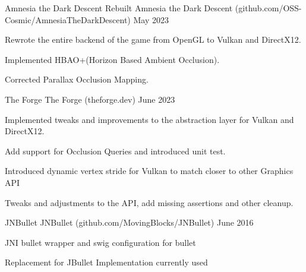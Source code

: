 

\begin{cventries}
  
  \cventry
  {Amnesia the Dark Descent Rebuilt} %
  {Amnesia the Dark Descent ({\tiny github.com/OSS-Cosmic/AmnesiaTheDarkDescent})} %
  {} 
  { May 2023 }
  {
    \begin{cvitems} %
      \item{Rewrote the entire backend of the game from OpenGL to Vulkan and DirectX12.}
      \item{Implemented HBAO+(Horizon Based Ambient Occlusion).}
      \item{Corrected Parallax Occlusion Mapping.}
    \end{cvitems}
  }


  \cventry
  {The Forge} %
  {The Forge ({\tiny theforge.dev})} %
  {} 
  { June 2023 }
  {
    \begin{cvitems} %
      \item{Implemented tweaks and improvements to the abstraction layer for Vulkan and DirectX12.}
      \item{Add support for Occlusion Queries and introduced unit test.}
      \item{Introduced dynamic vertex stride for Vulkan to match closer to other Graphics API}
      \item{Tweaks and adjustments to the API, add missing assertions and other cleanup.}
    \end{cvitems}
  }
  

    \cventry
    {JNBullet} %
    {JNBullet ({\tiny github.com/MovingBlocks/JNBullet})} %
    {} %
    { June 2016 } %
    {
      \begin{cvitems} %
        \item{JNI bullet wrapper and swig configuration for bullet}
        \item{Replacement for JBullet Implementation currently used }
      \end{cvitems}
    }
    


\end{cventries}
